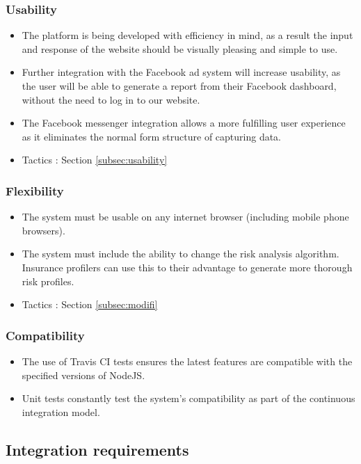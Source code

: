 \documentclass{article}
\begin{document}
		\subsubsection{Usability}
		\begin{itemize}
			\item The platform is being developed with efficiency in mind, as a result the input and response of the website should be visually pleasing and simple to use.
			\item Further integration with the Facebook ad system will increase usability, as the user will be able to generate a report from their Facebook dashboard, without the need to log in to our website.
			\item The Facebook messenger integration allows a more fulfilling user experience as it eliminates the normal form structure of capturing data.
			\item Tactics : Section \ref{subsec:usability}
		\end{itemize}

		\subsubsection{Flexibility}
		\begin{itemize}
			\item The system must be usable on any internet browser (including mobile phone browsers).
			\item The system must include the ability to change the risk analysis algorithm. Insurance profilers can use this to their advantage to generate more thorough risk profiles.
			\item Tactics : Section \ref{subsec:modifi}
		\end{itemize}

		\subsubsection{Compatibility}
		\begin{itemize}
			\item The use of Travis CI tests ensures the latest features are compatible with the specified versions of NodeJS.
			\item Unit tests constantly test the system's compatibility as part of the continuous integration model.
		\end{itemize}
		


	\subsection{Integration requirements}
\end{document}
